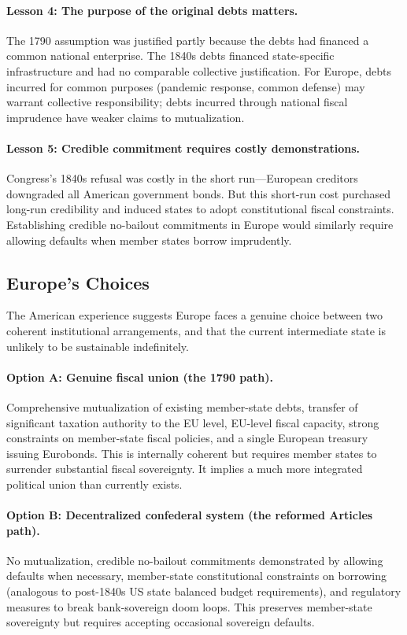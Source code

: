\documentclass[12pt]{article}
\begin{document}
\paragraph{Lesson 4: The purpose of the original debts matters.}
The 1790 assumption was justified partly because the debts had financed a
common national enterprise. The 1840s debts financed state-specific
infrastructure and had no comparable collective justification. For
Europe, debts incurred for common purposes (pandemic response, common
defense) may warrant collective responsibility; debts incurred through
national fiscal imprudence have weaker claims to mutualization.

\paragraph{Lesson 5: Credible commitment requires costly demonstrations.}
Congress's 1840s refusal was costly in the short run---European creditors
downgraded all American government bonds. But this short-run cost
purchased long-run credibility and induced states to adopt constitutional
fiscal constraints. Establishing credible no-bailout commitments in
Europe would similarly require allowing defaults when member states
borrow imprudently.


\subsection{Europe's Choices}

The American experience suggests Europe faces a genuine choice between
two coherent institutional arrangements, and that the current
intermediate state is unlikely to be sustainable indefinitely.

\paragraph{Option A: Genuine fiscal union (the 1790 path).}
Comprehensive mutualization of existing member-state debts, transfer of
significant taxation authority to the EU level, EU-level fiscal capacity,
strong constraints on member-state fiscal policies, and a single European
treasury issuing Eurobonds. This is internally coherent but requires
member states to surrender substantial fiscal sovereignty. It implies a
much more integrated political union than currently exists.

\paragraph{Option B: Decentralized confederal system (the reformed
Articles path).}
No mutualization, credible no-bailout commitments demonstrated by
allowing defaults when necessary, member-state constitutional constraints
on borrowing (analogous to post-1840s US state balanced budget
requirements), and regulatory measures to break bank-sovereign doom
loops. This preserves member-state sovereignty but requires accepting
occasional sovereign defaults.
\end{document}
